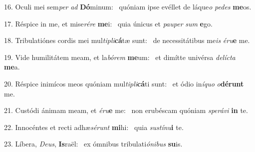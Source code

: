 16. Oculi mei sem\textit{per} \textit{ad} \textbf{Dó}minum: \ast\  quóniam ipse evéllet de láque\textit{o} \textit{pe}\textit{des} \textbf{me}os.\

17. Réspice in me, et mise\textit{ré}\textit{re} \textbf{me}i: \ast\  quia únicus et \textit{pau}\textit{per} \textit{sum} \textbf{e}go.\

18. Tribulatiónes cordis mei mul\textit{ti}\textit{pli}\textbf{cá}tæ sunt: \ast\  de necessitátibus me\textit{is} \textit{é}\textit{ru}\textbf{e} me.\

19. Vide humilitátem meam, et la\textit{bó}\textit{rem} \textbf{me}um: \ast\  et dimítte univérsa \textit{de}\textit{líc}\textit{ta} \textbf{me}a.\

20. Réspice inimícos meos quóniam mul\textit{ti}\textit{pli}\textbf{cá}ti sunt: \ast\  et ódio in\textit{í}\textit{quo} \textit{o}\textbf{dé}\textbf{runt} me.\

21. Custódi ánimam meam, et \textit{é}\textit{ru}\textbf{e} me: \ast\  non erubéscam quóniam \textit{spe}\textit{rá}\textit{vi} \textbf{in} te.\

22. Innocéntes et recti adhæ\textit{sé}\textit{runt} \textbf{mi}hi: \ast\  quia \textit{sus}\textit{tí}\textit{nu}\textbf{i} te.\

23. Líbera, \textit{De}\textit{us}, \textbf{Is}raël: \ast\  ex ómnibus tribulati\textit{ó}\textit{ni}\textit{bus} \textbf{su}is.\

